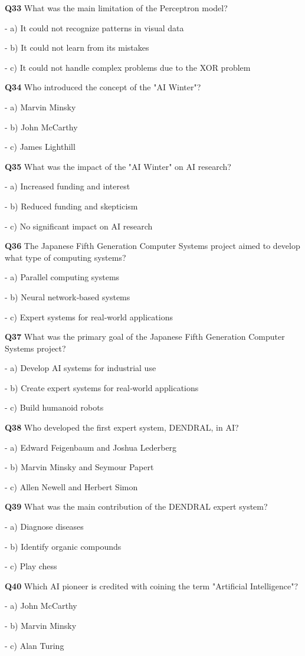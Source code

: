 \textbf{Q33} What was the main limitation of the Perceptron model?\par
\quad - a) It could not recognize patterns in visual data\par
\quad - b) It could not learn from its mistakes\par
\quad - c) It could not handle complex problems due to the XOR problem\par

\textbf{Q34} Who introduced the concept of the "AI Winter"?\par
\quad - a) Marvin Minsky\par
\quad - b) John McCarthy\par
\quad - c) James Lighthill\par

\textbf{Q35} What was the impact of the "AI Winter" on AI research?\par
\quad - a) Increased funding and interest\par
\quad - b) Reduced funding and skepticism\par
\quad - c) No significant impact on AI research\par

\textbf{Q36} The Japanese Fifth Generation Computer Systems project aimed to develop what type of computing systems?\par
\quad - a) Parallel computing systems\par
\quad - b) Neural network‑based systems\par
\quad - c) Expert systems for real‑world applications\par

\textbf{Q37} What was the primary goal of the Japanese Fifth Generation Computer Systems project?\par
\quad - a) Develop AI systems for industrial use\par
\quad - b) Create expert systems for real‑world applications\par
\quad - c) Build humanoid robots\par

\textbf{Q38} Who developed the first expert system, DENDRAL, in AI?\par
\quad - a) Edward Feigenbaum and Joshua Lederberg\par
\quad - b) Marvin Minsky and Seymour Papert\par
\quad - c) Allen Newell and Herbert Simon\par

\textbf{Q39} What was the main contribution of the DENDRAL expert system?\par
\quad - a) Diagnose diseases\par
\quad - b) Identify organic compounds\par
\quad - c) Play chess\par

\textbf{Q40} Which AI pioneer is credited with coining the term "Artificial Intelligence"?\par
\quad - a) John McCarthy\par
\quad - b) Marvin Minsky\par
\quad - c) Alan Turing\par